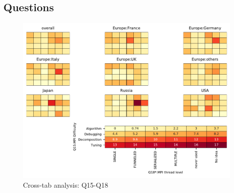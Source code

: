 
\subsection{Questions}


\begin{figure}
\begin{center}
\includegraphics[width=12cm]{../pdfs/Q15-Q18.pdf}
\caption{Cross-tab analysis: Q15-Q18}
\label{fig:Q15-Q18}
\end{center}
\end{figure}
